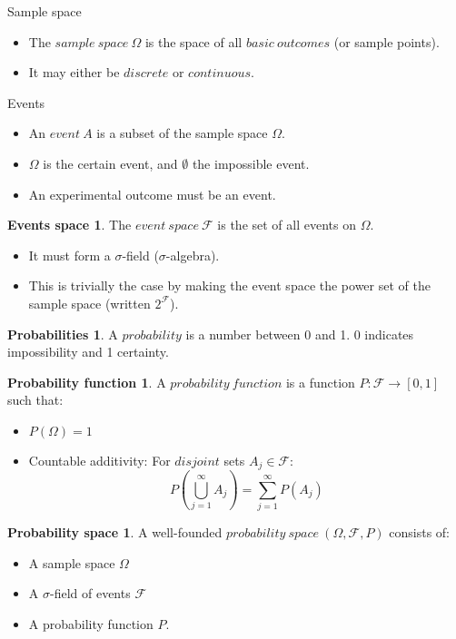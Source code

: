\documentclass{article}
\begin{document}
Sample space

\begin{itemize}
\item The $sample\ space\ \Omega$ is the space of all $basic\ outcomes$ (or sample points).
\item It may either be $discrete$ or $continuous$.
\end{itemize}


Events

\begin{itemize}
\item An $event\ A$ is a subset of the sample space $\Omega$.
\item $\Omega$ is the certain event, and $\emptyset$ the impossible event.
\item An experimental outcome must be an event.
\end{itemize}

\theoremstyle{definition}
\newtheorem*{espac}{Events space}
\begin{espac}
The $event\ space\ \mathcal{F}$ is the set of all events on $\Omega$.
\begin{itemize}
\item It must form a $\sigma$-field ($\sigma$-algebra).
\item This is trivially the case by making the event space the power set of the sample space (written $2^\mathcal{F}$).
\end{itemize}
\end{espac}

\theoremstyle{definition}
\newtheorem*{prob}{Probabilities}
\begin{prob}
A $probability$ is a number between 0 and 1. 0 indicates impossibility and 1 certainty.
\end{prob}

\theoremstyle{definition}
\newtheorem*{pfunc}{Probability function}
\begin{pfunc}
	A $probability\ function$ is a function $P: \mathcal{F} \rightarrow [0,1]$ such that:
	\begin{itemize}
	\item $P(\Omega) = 1$
	\item Countable additivity: For $disjoint$ sets $A_j \in \mathcal{F}$: 
	\[
	P(\bigcup_{j=1}^\infty A_j) = \sum_{j=1}^\infty P(A_j)
	\]
	\end{itemize}
\end{pfunc}

\theoremstyle{definition}
\newtheorem*{pspac}{Probability space}
\begin{pspac}
	A well-founded $probability\ space\ (\Omega, \mathcal{F}, P)$ consists of:
	\begin{itemize}
	\item A sample space $\Omega$
	\item A $\sigma$-field of events $\mathcal{F}$
	\item A probability function $P$.
	\end{itemize}
\end{pspac}
\end{document}
